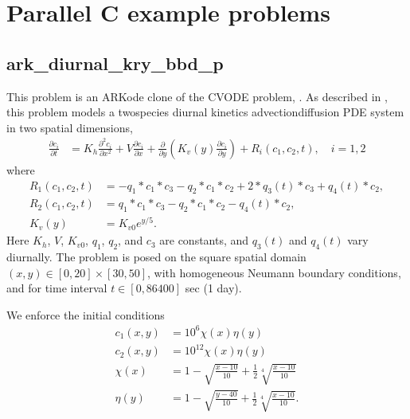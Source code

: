 \documentclass[letterpaper,10pt,english]{sphinxmanual}
\begin{document}
\sphinxstepscope


\chapter{Parallel C example problems}
\label{\detokenize{c_parallel:parallel-c-example-problems}}\label{\detokenize{c_parallel:parallel-c}}\label{\detokenize{c_parallel::doc}}

\section{ark\_diurnal\_kry\_bbd\_p}
\label{\detokenize{c_parallel:ark-diurnal-kry-bbd-p}}\label{\detokenize{c_parallel:id1}}
\sphinxAtStartPar
This problem is an ARKode clone of the CVODE problem,
.  As described in , this problem
models a two\sphinxhyphen{}species diurnal kinetics advection\sphinxhyphen{}diffusion PDE system
in two spatial dimensions,
\begin{equation*}
\begin{split}\frac{\partial c_i}{\partial t} &=
  K_h \frac{\partial^2 c_i}{\partial x^2} +
  V \frac{\partial     c_i}{\partial x} +
  \frac{\partial}{\partial y}\left( K_v(y)
  \frac{\partial c_i}{\partial y}\right) +
  R_i(c_1,c_2,t),\quad i=1,2\end{split}
\end{equation*}
\sphinxAtStartPar
where
\begin{equation*}
\begin{split}R_1(c_1,c_2,t) &= -q_1*c_1*c_3 - q_2*c_1*c_2 + 2*q_3(t)*c_3 + q_4(t)*c_2, \\
R_2(c_1,c_2,t) &=  q_1*c_1*c_3 - q_2*c_1*c_2 - q_4(t)*c_2, \\
K_v(y) &= K_{v0} e^{y/5}.\end{split}
\end{equation*}
\sphinxAtStartPar
Here \(K_h\), \(V\), \(K_{v0}\), \(q_1\), \(q_2\),
and \(c_3\) are constants, and \(q_3(t)\) and \(q_4(t)\)
vary diurnally.  The problem is posed on the square spatial domain
\((x,y) \in [0,20]\times[30,50]\), with homogeneous Neumann
boundary conditions, and for time interval \(t\in [0,86400]\) sec
(1 day).

\sphinxAtStartPar
We enforce the initial conditions
\begin{equation*}
\begin{split}c_1(x,y) &=  10^6 \chi(x)\eta(y) \\
c_2(x,y) &=  10^{12} \chi(x)\eta(y) \\
\chi(x) &= 1 - \sqrt{\frac{x - 10}{10}} + \frac12 \sqrt[4]{\frac{x - 10}{10}} \\
\eta(y) &= 1 - \sqrt{\frac{y - 40}{10}} + \frac12 \sqrt[4]{\frac{x - 10}{10}}.\end{split}
\end{equation*}
\end{document}
